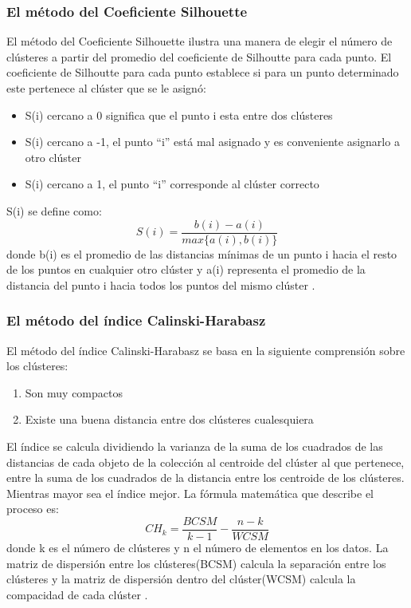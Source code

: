 \subsubsection{El método del Coeficiente Silhouette  }
El método del Coeficiente Silhouette ilustra una manera de elegir el número de clústeres a partir del promedio del coeficiente de Silhoutte para cada punto. El coeficiente de Silhoutte para cada punto establece si para un punto determinado este pertenece al clúster que se le asignó:
\begin{itemize}
	\item S(i) cercano a 0 significa que el punto i esta entre dos clústeres
	\item S(i) cercano a -1, el punto “i” está mal asignado y es conveniente asignarlo a otro clúster
	\item S(i) cercano a 1, el punto “i” corresponde al clúster correcto
\end{itemize}
S(i) se define como:
\begin{equation}
S(i) = \frac{b(i) - a(i)}{max \{a(i),b(i)\} }
\end{equation}
donde b(i) es el promedio de las distancias mínimas de un punto i hacia el resto de los puntos en cualquier otro clúster y a(i) representa el promedio de la distancia del punto i hacia todos los puntos del mismo clúster \cite{Kaoungku2018TheSW}.
\subsubsection{El método del índice Calinski-Harabasz   }
El método del índice Calinski-Harabasz se basa en la siguiente comprensión sobre los clústeres:
\begin{enumerate}
	\item Son muy compactos
	\item Existe una buena distancia entre dos clústeres cualesquiera
\end{enumerate}
El índice se calcula dividiendo la varianza de la suma de los cuadrados de las distancias de cada objeto de la colección al centroide del clúster al que pertenece, entre la suma de los cuadrados de la distancia entre los centroide de los clústeres. Mientras mayor sea el índice mejor. La fórmula matemática que describe el proceso es:
\begin{equation}
	CH_k = \frac{BCSM}{k - 1} - \frac{n - k}{WCSM}
\end{equation}
donde k es el número de clústeres y n el número de elementos en los datos. La matriz de dispersión entre los clústeres(BCSM) calcula la separación entre los clústeres y la matriz de dispersión dentro del clúster(WCSM) calcula la compacidad de cada clúster \cite{Wang2019AnII}.

